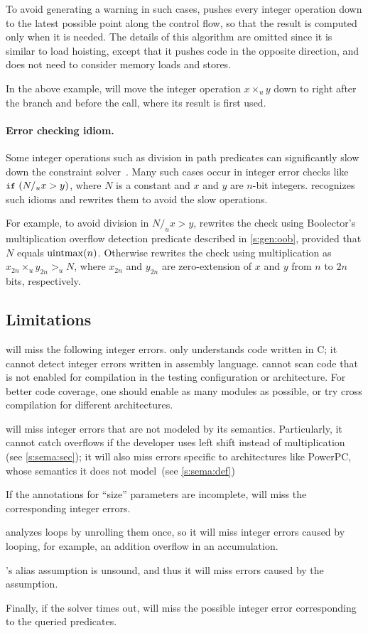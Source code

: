 To avoid generating a warning in such cases, \sys pushes every
integer operation down to the latest possible point along the control
flow, so that the result is computed only when it is needed.  The
details of this algorithm are omitted since it is similar to load
hoisting, except that it pushes code in the opposite direction, and
does not need to consider memory loads and stores.

In the above example, \sys will move the integer operation $x
\times_u y$ down to right after the  branch and before the
 call, where its result  is first used.

\paragraph{Error checking idiom.}

Some integer operations such as division in path predicates can
significantly slow down the constraint solver~\cite{brummayer:perf}.
Many such cases occur in integer error checks like $\cc{if}\ (N /_u
x > y)$, where $N$ is a constant and $x$ and $y$ are $n$-bit integers.
\sys recognizes such idioms and rewrites them to avoid the slow
operations.

For example, to avoid division in $N /_u x > y$, \sys rewrites the check using
Boolector's multiplication overflow detection predicate described
in \autoref{s:gen:oob}, provided that $N$ equals $\operatorname{uintmax}(n)$.
Otherwise \sys rewrites the check using multiplication as $x_{2n}
\times_u y_{2n} >_u N$, where $x_{2n}$ and $y_{2n}$ are zero-extension
of $x$ and $y$ from $n$ to $2n$ bits, respectively.

\subsection{Limitations}
\label{s:gen:limit}

\sys will miss the following integer errors.
%
\sys only understands code written in C; it cannot detect integer
errors written in assembly language.
%
\sys cannot scan code that is not enabled for compilation in the
testing configuration or architecture.  For better code coverage,
one should enable as many modules as possible, or try cross compilation
for different architectures.

\sys will miss integer errors
that are not modeled by its semantics.  Particularly, it cannot catch
overflows if the developer uses left shift instead of multiplication
(see \autoref{s:sema:sec});
it will also miss errors specific to architectures like PowerPC,
whose semantics it does not model~(see \autoref{s:sema:def})

If the annotations for ``size'' parameters are incomplete, \sys will
miss the corresponding integer errors.

\sys analyzes loops by unrolling them once, so it will miss integer
errors caused by looping, for example, an addition overflow in an
accumulation.

\sys's alias assumption is unsound, and thus it will miss errors
caused by the assumption.

Finally, if the solver times out, \sys will miss the possible integer
error corresponding to the queried predicates.
